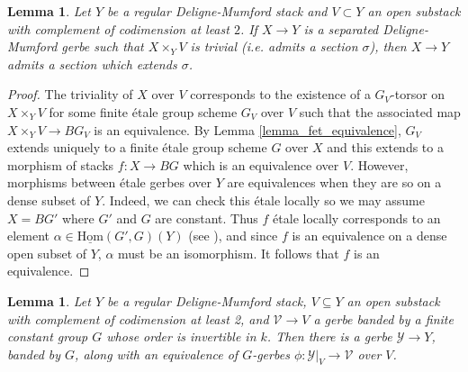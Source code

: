 \documentclass{amsart}
\newcommand{\cV}{\mathcal{V}}
\newcommand{\cY}{\mathcal{Y}}
\newtheorem{Lemma}[theorem]{Lemma}
\theoremstyle{definition}
\newcommand{\marg}[1]{\normalsize{{\color{red}\footnote{{\color{blue}#1}}}{\marginpar[{\color{red}\hfill\tiny\thefootnote$\rightarrow$}]{{\color{red}$\leftarrow$\tiny\thefootnote}}}}}
\newcommand{\Gio}[1]{\marg{(Giovanni) #1}}
\newcommand{\A}[1]{\marg{(Andrea) #1}}
\begin{document}

\begin{Lemma} \label{lemma:trivialgerbeopen} Let $Y$ be a regular Deligne-Mumford stack and $V \subset Y$ an open substack with complement of codimension at least $2$. If $X \to Y$ is a separated Deligne-Mumford gerbe such that $X \times_Y V$ is trivial (i.e. admits a section $\sigma$), then $X \to Y$ admits a section which extends $\sigma$. \end{Lemma}

\begin{proof} The triviality of $X$ over $V$ corresponds to the existence of a $G_V$-torsor on $X \times_Y V$ for some finite \'etale group scheme $G_V$ over $V$ such that the associated map $X \times_Y V \to BG_V$ is an equivalence. By Lemma \ref{lemma_fet_equivalence}, $G_V$ extends uniquely to a finite \'etale group scheme $G$ over $X$ and this extends to a morphism of stacks $f\colon X \to BG$ which is an equivalence over $V$. However, morphisms between \'etale gerbes over $Y$ are equivalences when they are so on a dense subset of $Y$. Indeed, we can check this \'etale locally so we may assume $X=BG'$ where $G'$ and $G$ are constant. Thus $f$ \'etale locally corresponds to an element $\alpha 
\in \underline{\mathrm{Hom}}(G',G)(Y)$ (see \cite[Lem. 3.9]{AOV_tame}), and since $f$ is an equivalence on a dense open subset of $Y$, $\alpha$ must be an isomorphism. It follows that $f$ is an equivalence. \end{proof}

\begin{Lemma}\label{lemma_extension_gerbes}
    Let $Y$ be a regular Deligne-Mumford stack, $V\subseteq Y$ an open substack with complement of codimension at least 2, and $\cV\to V$ a gerbe banded by a finite constant group $G$ whose order is invertible in $k$. Then there is a gerbe $\cY\to Y$, banded by $G$, along with an equivalence of $G$-gerbes $\phi: \cY|_{V} \to \cV$ over $V$. 
    \end{Lemma}
\end{document}
